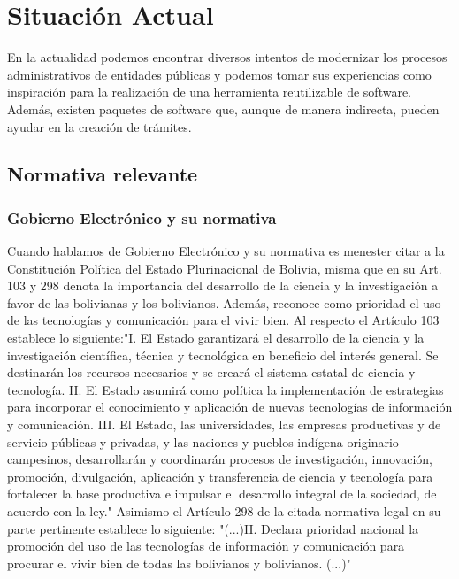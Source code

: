 \section{Situación Actual}

En la actualidad podemos encontrar diversos intentos de modernizar los procesos administrativos de entidades públicas y podemos tomar sus experiencias como inspiración para la realización de una herramienta reutilizable de software. Además, existen paquetes de software que, aunque de manera indirecta, pueden ayudar en la creación de trámites.
\subsection{Normativa relevante}
\subsubsection{Gobierno Electrónico y su normativa}
Cuando hablamos de Gobierno Electrónico y su normativa es menester citar a la Constitución Política del Estado Plurinacional de Bolivia, misma que en su Art. 103 y 298 denota la importancia del desarrollo de la ciencia y la investigación a favor de las bolivianas y los bolivianos. Además, reconoce como prioridad el uso de las tecnologías y comunicación para el vivir bien. Al respecto el Artículo 103 establece lo siguiente:"I. El Estado garantizará el desarrollo de la ciencia y la investigación científica, técnica y tecnológica en beneficio del interés general. Se destinarán los recursos necesarios y se creará el sistema estatal de ciencia y tecnología. II. El Estado asumirá como política la implementación de estrategias para incorporar el conocimiento y aplicación de nuevas tecnologías de información y comunicación. III. El Estado, las universidades, las empresas productivas y de servicio públicas y privadas, y las naciones y pueblos indígena originario campesinos, desarrollarán y coordinarán procesos de investigación, innovación, promoción, divulgación, aplicación y transferencia de ciencia y tecnología para fortalecer la base productiva e impulsar el desarrollo integral de la sociedad, de acuerdo con la ley." Asimismo el Artículo 298 de la citada normativa legal en su parte pertinente establece lo siguiente: "(...)II. Declara prioridad nacional la promoción del uso de las tecnologías de información y comunicación para procurar el vivir bien de todas las bolivianos y bolivianos. (...)"

